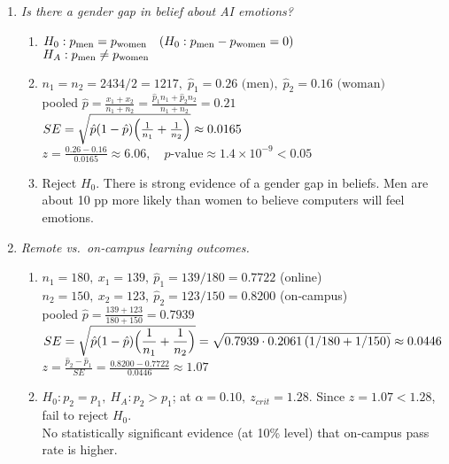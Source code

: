 \documentclass{article}
\begin{document}
\begin{enumerate}
\item \emph{Is there a gender gap in belief about AI emotions?}
\begin{enumerate}[label=(\alph*)]
  \item 
    $H_0: p_{\rm men}=p_{\rm women}\quad(H_0:p_{\rm men}-p_{\rm women}=0)$\\
    $H_A: p_{\rm men}\neq p_{\rm women}$
  \item 
    $n_1=n_2=2434/2=1217,\;\hat p_1=0.26 \text{ (men)},\;\hat p_2=0.16\text{ (woman)}$\\
    pooled $\displaystyle \hat p=\frac{x_1+x_2}{n_1+n_2}=\frac{\hat p_1n_1+\hat p_2n_2}{n_1+n_2}=0.21$\\
    $SE=\sqrt{\hat p(1-\hat p)\Bigl(\frac1{n_1}+\frac1{n_2}\Bigr)}\approx0.0165$\\
    $z=\frac{0.26-0.16}{0.0165}\approx6.06,\quad p\text{-value}\approx1.4\times10^{-9}<0.05\,$
  \item 
    Reject $H_0$.  There is strong evidence of a gender gap in beliefs.  Men are about 10 pp more likely than women to believe computers will feel emotions.
\end{enumerate}

\item \emph{Remote vs.\ on‑campus learning outcomes.}
\begin{enumerate}[label=(\alph*)]
  \item 
    $n_1=180,\ x_1=139,\ \hat p_1=139/180=0.7722$ (online)\\
    $n_2=150,\ x_2=123,\ \hat p_2=123/150=0.8200$ (on‑campus)\\
    pooled $\displaystyle \hat p=\frac{139+123}{180+150}=0.7939$\\
    $\displaystyle SE=\sqrt{\hat p(1-\hat p)\Bigl(\frac1{n_1}+\frac1{n_2}\Bigr)}
      =\sqrt{0.7939\cdot0.2061\,(1/180+1/150)}\approx0.0446$\\
    $\displaystyle z=\frac{\hat p_2-\hat p_1}{SE}=\frac{0.8200-0.7722}{0.0446}\approx1.07$
  \item 
    $H_0:p_2=p_1,\ H_A:p_2>p_1$; at $\alpha=0.10,\ z_{crit}=1.28$.  Since $z=1.07<1.28$, fail to reject $H_0$.\\
    No statistically significant evidence (at 10\% level) that on‑campus pass rate is higher.
\end{enumerate}


\end{enumerate}
\end{document}
